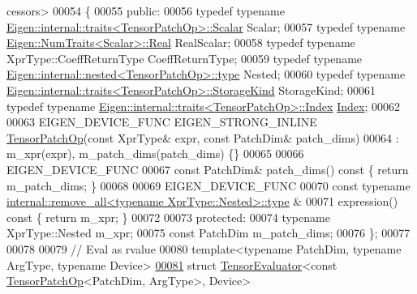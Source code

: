 \begin{DoxyCode}
      cessors>
00054 \{
00055   \textcolor{keyword}{public}:
00056   \textcolor{keyword}{typedef} \textcolor{keyword}{typename} \hyperlink{struct_eigen_1_1internal_1_1traits}{Eigen::internal::traits<TensorPatchOp>::Scalar}
       Scalar;
00057   \textcolor{keyword}{typedef} \textcolor{keyword}{typename} \hyperlink{group___sparse_core___module}{Eigen::NumTraits<Scalar>::Real} RealScalar;
00058   \textcolor{keyword}{typedef} \textcolor{keyword}{typename} XprType::CoeffReturnType CoeffReturnType;
00059   \textcolor{keyword}{typedef} \textcolor{keyword}{typename} \hyperlink{class_eigen_1_1internal_1_1_tensor_lazy_evaluator_writable}{Eigen::internal::nested<TensorPatchOp>::type}
       Nested;
00060   \textcolor{keyword}{typedef} \textcolor{keyword}{typename} \hyperlink{struct_eigen_1_1internal_1_1traits}{Eigen::internal::traits<TensorPatchOp>::StorageKind}
       StorageKind;
00061   \textcolor{keyword}{typedef} \textcolor{keyword}{typename} \hyperlink{struct_eigen_1_1internal_1_1traits}{Eigen::internal::traits<TensorPatchOp>::Index}
       \hyperlink{namespace_eigen_a62e77e0933482dafde8fe197d9a2cfde}{Index};
00062 
00063   EIGEN\_DEVICE\_FUNC EIGEN\_STRONG\_INLINE \hyperlink{class_eigen_1_1_tensor_patch_op}{TensorPatchOp}(\textcolor{keyword}{const} XprType& expr, \textcolor{keyword}{const} PatchDim& 
      patch\_dims)
00064       : m\_xpr(expr), m\_patch\_dims(patch\_dims) \{\}
00065 
00066     EIGEN\_DEVICE\_FUNC
00067     \textcolor{keyword}{const} PatchDim& patch\_dims()\textcolor{keyword}{ const }\{ \textcolor{keywordflow}{return} m\_patch\_dims; \}
00068 
00069     EIGEN\_DEVICE\_FUNC
00070     \textcolor{keyword}{const} \textcolor{keyword}{typename} \hyperlink{group___sparse_core___module}{internal::remove\_all<typename XprType::Nested>::type}
      &
00071     expression()\textcolor{keyword}{ const }\{ \textcolor{keywordflow}{return} m\_xpr; \}
00072 
00073   \textcolor{keyword}{protected}:
00074     \textcolor{keyword}{typename} XprType::Nested m\_xpr;
00075     \textcolor{keyword}{const} PatchDim m\_patch\_dims;
00076 \};
00077 
00078 
00079 \textcolor{comment}{// Eval as rvalue}
00080 \textcolor{keyword}{template}<\textcolor{keyword}{typename} PatchDim, \textcolor{keyword}{typename} ArgType, \textcolor{keyword}{typename} Device>
\hyperlink{struct_eigen_1_1_tensor_evaluator_3_01const_01_tensor_patch_op_3_01_patch_dim_00_01_arg_type_01_4_00_01_device_01_4}{00081} \textcolor{keyword}{struct }\hyperlink{struct_eigen_1_1_tensor_evaluator}{TensorEvaluator}<const \hyperlink{class_eigen_1_1_tensor_patch_op}{TensorPatchOp}<PatchDim, ArgType>, Device>

\end{DoxyCode}
